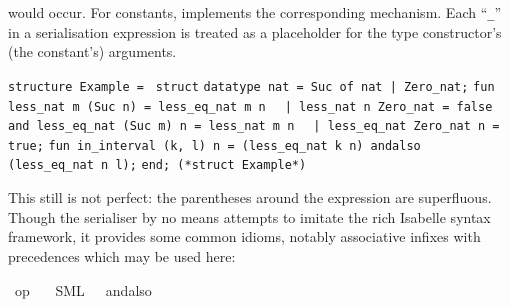 \begin{isabellebody}
\begin{isamarkuptext}
  would occur.  For constants, \hyperlink{command.code-const}{\mbox{}} implements
  the corresponding mechanism.  Each ``\verb|_|'' in
  a serialisation expression is treated as a placeholder
  for the type constructor's (the constant's) arguments.%
\end{isamarkuptext}%
\isamarkuptrue%
%
\isadelimquote
%
\endisadelimquote
%
\isatagquote
%
\begin{isamarkuptext}%
\isaverbatim%
\noindent%
\verb|structure Example = |\newline%
\verb|struct|\newline%
\newline%
\verb|datatype nat = Suc of nat |\verb,|,\verb| Zero_nat;|\newline%
\newline%
\verb|fun less_nat m (Suc n) = less_eq_nat m n|\newline%
\verb|  |\verb,|,\verb| less_nat n Zero_nat = false|\newline%
\verb|and less_eq_nat (Suc m) n = less_nat m n|\newline%
\verb|  |\verb,|,\verb| less_eq_nat Zero_nat n = true;|\newline%
\newline%
\verb|fun in_interval (k, l) n = (less_eq_nat k n) andalso (less_eq_nat n l);|\newline%
\newline%
\verb|end; (*struct Example*)|%
\end{isamarkuptext}%
\isamarkuptrue%
%
\endisatagquote
{\isafoldquote}%
%
\isadelimquote
%
\endisadelimquote
%
\begin{isamarkuptext}%
\noindent This still is not perfect: the parentheses
  around the  expression are superfluous.
  Though the serialiser
  by no means attempts to imitate the rich Isabelle syntax
  framework, it provides some common idioms, notably
  associative infixes with precedences which may be used here:%
\end{isamarkuptext}%
\isamarkuptrue%
%
\isadelimquotett
%
\endisadelimquotett
%
\isatagquotett
{}\isamarkupfalse%
\ {\isachardoublequoteopen}op\ {\isasymand}{\isachardoublequoteclose}\isanewline
\ \ {\isacharparenleft}SML\ \ {}\ {\isachardoublequoteopen}andalso{\isachardoublequoteclose}{\isacharparenright}%
\endisatagquotett
{\isafoldquotett}%
%
\isadelimquotett
%
\endisadelimquotett
%
\isadelimquote
%
\endisadelimquote
%
\isatagquote
%
\begin{isamarkuptext}%

\end{isamarkuptext}
\end{isabellebody}
